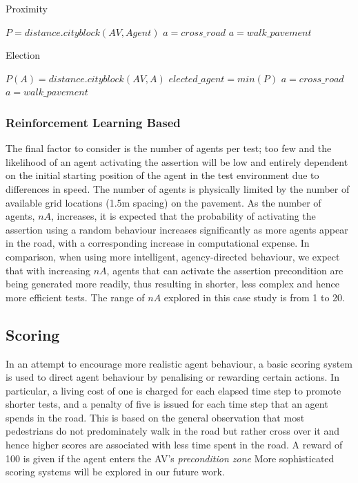 \documentclass[letterpaper, 10 pt, journal, twoside]{IEEEtran}
\begin{document}
\begin{algorithm}
\caption{Proximity}\label{algo:prox}
\begin{algorithmic}[1]
\State $P = distance.cityblock(AV,Agent)$
    \State $a=cross\_road$
\Else
	\State $a=walk\_pavement$
\EndIf
\EndWhile
\end{algorithmic}
\end{algorithm}

\begin{algorithm}
\caption{Election}\label{algo:elect}
\begin{algorithmic}[1]
	\State $P(A) = distance.cityblock(AV,A)$
\EndFor
		$elected\_agent=min(P)$
	\EndIf
	    \State $a=cross\_road$
	\Else
		\State $a=walk\_pavement$
	\EndIf
\EndWhile
\end{algorithmic}
\end{algorithm}

\subsubsection{Reinforcement Learning Based}
The final factor to consider is the number of agents per test; too few and the likelihood of an agent activating the assertion will be low and entirely dependent on the initial starting position of the agent in the test environment due to differences in speed. The number of agents is physically limited by the number of available grid locations (1.5m spacing) on the pavement. As the number of agents, $nA$, increases, it is expected that the probability of activating the assertion using a random behaviour increases significantly as more agents appear in the road, with a corresponding increase in computational expense. In comparison, when using more intelligent, agency-directed behaviour, we expect that with increasing $nA$, agents that can activate the assertion precondition are being generated more readily, thus resulting in shorter, less complex and hence more efficient tests. The range of $nA$ explored in this case study is from 1 to 20.

\subsection{Scoring}

In an attempt to encourage more realistic agent behaviour, a basic scoring system is used to direct agent behaviour by penalising or rewarding certain actions. In particular, a living cost of one is charged for each elapsed time step to promote shorter tests, and a penalty of five is issued for each time step that an agent spends in the road. This is based on the general observation that most pedestrians do not predominately walk in the road but rather cross over it and hence higher scores are associated with less time spent in the road. A reward of 100 is given if the agent enters the AV's \textit{precondition zone} More sophisticated scoring systems will be explored in our future work. 
\end{document}
